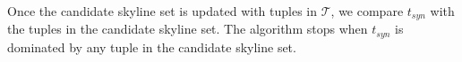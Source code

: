 
Once the candidate skyline set is updated with tuples in $\mathcal{T}$, we compare $t_{syn}$ with the tuples in the candidate skyline set. The algorithm stops when $t_{syn}$ is dominated by any tuple in the candidate skyline set.



